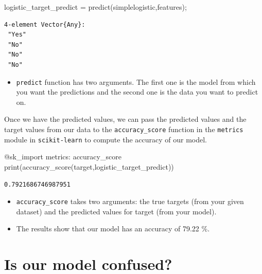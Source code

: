 \documentclass[
  letterpaper,
]{book}
\newenvironment{Shaded}{\begin{snugshade}}{\end{snugshade}}
\newcommand{\FunctionTok}[1]{\textcolor[rgb]{0.28,0.35,0.67}{#1}}
\newcommand{\NormalTok}[1]{\textcolor[rgb]{0.00,0.23,0.31}{#1}}
\newcommand{\OperatorTok}[1]{\textcolor[rgb]{0.37,0.37,0.37}{#1}}
\newcommand{\PreprocessorTok}[1]{\textcolor[rgb]{0.68,0.00,0.00}{#1}}
\providecommand{\tightlist}{%
  \setlength{\itemsep}{0pt}\setlength{\parskip}{0pt}}\usepackage{longtable,booktabs,array}
\begin{document}
\begin{Shaded}
\begin{Highlighting}[]
\NormalTok{logistic\_target\_predict }\OperatorTok{=} \FunctionTok{predict}\NormalTok{(simplelogistic,features);}
\end{Highlighting}
\end{Shaded}

\begin{verbatim}
4-element Vector{Any}:
 "Yes"
 "No"
 "No"
 "No"
\end{verbatim}

\begin{itemize}
\tightlist
\item
  \texttt{predict} function has two arguments. The first one is the
  model from which you want the predictions and the second one is the
  data you want to predict on.
\end{itemize}

Once we have the predicted values, we can pass the predicted values and
the target values from our data to the \texttt{accuracy\_score} function
in the \texttt{metrics} module in \texttt{scikit-learn} to compute the
accuracy of our model.

\begin{Shaded}
\begin{Highlighting}[]
\PreprocessorTok{@sk\_import}\NormalTok{ metrics}\OperatorTok{:}\NormalTok{ accuracy\_score}
\FunctionTok{print}\NormalTok{(}\FunctionTok{accuracy\_score}\NormalTok{(target,logistic\_target\_predict))}
\end{Highlighting}
\end{Shaded}

\begin{verbatim}
0.7921686746987951
\end{verbatim}

\begin{itemize}
\tightlist
\item
  \texttt{accuracy\_score} takes two arguments: the true targets (from
  your given dataset) and the predicted values for target (from your
  model).
\end{itemize}

\begin{itemize}
\tightlist
\item
  The results show that our model has an accuracy of 79.22 \%.
\end{itemize}

\hypertarget{is-our-model-confused}{%
\section{Is our model confused?}\label{is-our-model-confused}}
\end{document}
